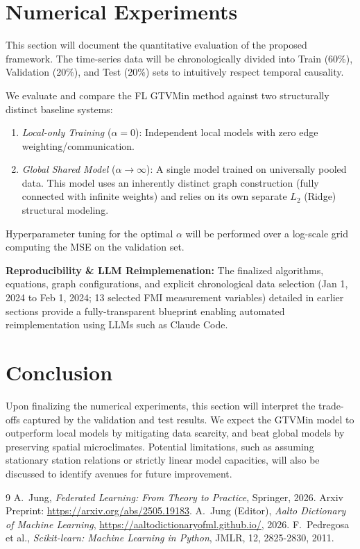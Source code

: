 \documentclass{article}
\begin{document}
\section{Numerical Experiments}
\label{sec:experiments}

This section will document the quantitative evaluation of the proposed framework. The time-series data will be chronologically divided into Train (60\%), Validation (20\%), and Test (20\%) sets to intuitively respect temporal causality.

We evaluate and compare the FL GTVMin method against two structurally distinct baseline systems:
\begin{enumerate}
    \item \textit{Local-only Training} ($\alpha = 0$): Independent local models with zero edge weighting/communication.
    \item \textit{Global Shared Model} ($\alpha \to \infty$): A single model trained on universally pooled data. This model uses an inherently distinct graph construction (fully connected with infinite weights) and relies on its own separate $L_2$ (Ridge) structural modeling.
\end{enumerate}
Hyperparameter tuning for the optimal $\alpha$ will be performed over a log-scale grid computing the MSE on the validation set. 

\textbf{Reproducibility \& LLM Reimplemenation:} The finalized algorithms, equations, graph configurations, and explicit chronological data selection (Jan 1, 2024 to Feb 1, 2024; 13 selected FMI measurement variables) detailed in earlier sections provide a fully-transparent blueprint enabling automated reimplementation using LLMs such as Claude Code.

\section{Conclusion}
\label{sec:conclusion}

Upon finalizing the numerical experiments, this section will interpret the trade-offs captured by the validation and test results. We expect the GTVMin model to outperform local models by mitigating data scarcity, and beat global models by preserving spatial microclimates. Potential limitations, such as assuming stationary station relations or strictly linear model capacities, will also be discussed to identify avenues for future improvement.

\begin{thebibliography}{9}
	 A.~Jung, \textit{Federated Learning: From Theory to Practice}, Springer, 2026. Arxiv Preprint: \url{https://arxiv.org/abs/2505.19183}.
	 A.~Jung (Editor), \textit{Aalto Dictionary of Machine Learning}, \url{https://aaltodictionaryofml.github.io/}, 2026.
     F.~Pedregosa et al., \textit{Scikit-learn: Machine Learning in Python}, JMLR, 12, 2825-2830, 2011.
\end{thebibliography}
\end{document}
